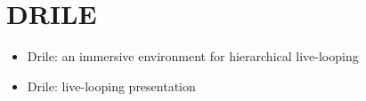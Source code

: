 \section{DRILE}
\begin{frame}
\begin{itemize}
\item Drile: an immersive environment for hierarchical live-looping
\item Drile: live-looping presentation 
\end{itemize}


\end{frame}
